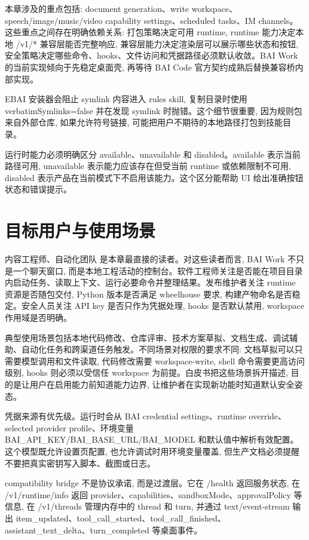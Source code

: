 本章涉及的重点包括: document generation、write workspace、speech/image/music/video capability settings、scheduled tasks、IM channels。这些重点之间存在明确依赖关系: 打包策略决定可用 runtime, runtime 能力决定本地 /v1/* 兼容层能否完整响应, 兼容层能力决定渲染层可以展示哪些状态和按钮, 安全策略决定哪些命令、hooks、文件访问和凭据路径必须默认收敛。BAI Work 的当前实现倾向于先稳定桌面壳, 再等待 BAI Code 官方契约成熟后替换兼容桥内部实现。

EBAI 安装器会阻止 symlink 内容进入 rules skill, 复制目录时使用 verbatimSymlinks=false 并在发现 symlink 时抛错。这个细节很重要, 因为规则包来自外部仓库, 如果允许符号链接, 可能把用户不期待的本地路径打包到技能目录。

运行时能力必须明确区分 available、unavailable 和 disabled。available 表示当前路径可用, unavailable 表示能力应该存在但受当前 runtime 或依赖限制不可用, disabled 表示产品在当前模式下不启用该能力。这个区分能帮助 UI 给出准确按钮状态和错误提示。

\section{目标用户与使用场景}
内容工程师、自动化团队 是本章最直接的读者。对这些读者而言, BAI Work 不只是一个聊天窗口, 而是本地工程活动的控制台。软件工程师关注是否能在项目目录内启动任务、读取上下文、运行必要命令并整理结果。发布维护者关注 runtime 资源是否随包交付, Python 版本是否满足 wheelhouse 要求, 构建产物命名是否稳定。安全人员关注 API key 是否只作为凭据处理, hooks 是否默认禁用, workspace 作用域是否明确。

典型使用场景包括本地代码修改、仓库评审、技术方案草拟、文档生成、调试辅助、自动化任务和跨渠道任务触发。不同场景对权限的要求不同: 文档草拟可以只需要模型调用和文件读取, 代码修改需要 workspace-write, shell 命令需要更高访问级别, hooks 则必须以受信任 workspace 为前提。白皮书把这些场景拆开描述, 目的是让用户在启用能力前知道能力边界, 让维护者在实现新功能时知道默认安全姿态。

凭据来源有优先级。运行时会从 BAI credential settings、runtime override、selected provider profile、环境变量 BAI\_API\_KEY/BAI\_BASE\_URL/BAI\_MODEL 和默认值中解析有效配置。这个模型既允许设置页配置, 也允许调试时用环境变量覆盖, 但生产文档必须提醒不要把真实密钥写入脚本、截图或日志。

compatibility bridge 不是协议承诺, 而是过渡层。它在 /health 返回服务状态, 在 /v1/runtime/info 返回 provider、capabilities、sandboxMode、approvalPolicy 等信息, 在 /v1/threads 管理内存中的 thread 和 turn, 并通过 text/event-stream 输出 item\_updated、tool\_call\_started、tool\_call\_finished、assistant\_text\_delta、turn\_completed 等桌面事件。

